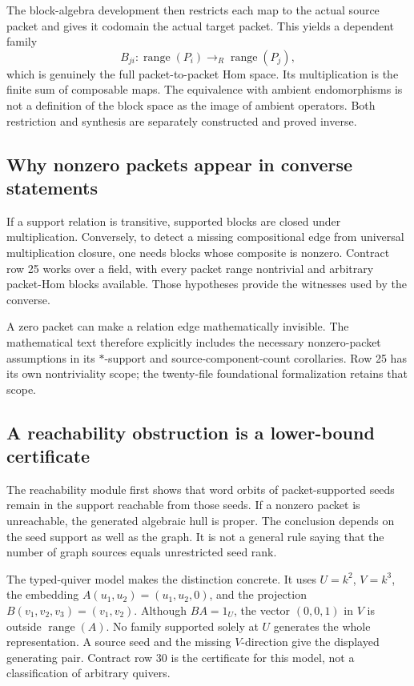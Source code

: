 \documentclass[11pt,a4paper]{article}
\begin{document}
The block-algebra development then restricts each map to the actual source packet and gives it codomain the actual target packet. This yields a dependent family
\[
B_{ji}:\operatorname{range}(P_i)\longrightarrow_R\operatorname{range}(P_j),
\]
which is genuinely the full packet-to-packet Hom space. Its multiplication is the finite sum of composable maps. The equivalence with ambient endomorphisms is not a definition of the block space as the image of ambient operators. Both restriction and synthesis are separately constructed and proved inverse.

\subsection{Why nonzero packets appear in converse statements}

If a support relation is transitive, supported blocks are closed under multiplication. Conversely, to detect a missing compositional edge from universal multiplication closure, one needs blocks whose composite is nonzero. Contract row 25 works over a field, with every packet range nontrivial and arbitrary packet-Hom blocks available. Those hypotheses provide the witnesses used by the converse.

A zero packet can make a relation edge mathematically invisible. The mathematical text therefore explicitly includes the necessary nonzero-packet assumptions in its $*$-support and source-component-count corollaries. Row 25 has its own nontriviality scope; the twenty-file foundational formalization retains that scope.

\subsection{A reachability obstruction is a lower-bound certificate}

The reachability module first shows that word orbits of packet-supported seeds remain in the support reachable from those seeds. If a nonzero packet is unreachable, the generated algebraic hull is proper. The conclusion depends on the seed support as well as the graph. It is not a general rule saying that the number of graph sources equals unrestricted seed rank.

The typed-quiver model makes the distinction concrete. It uses $U=k^2$, $V=k^3$, the embedding
$A(u_1,u_2)=(u_1,u_2,0)$, and the projection $B(v_1,v_2,v_3)=(v_1,v_2)$. Although $BA=1_U$, the vector $(0,0,1)$ in $V$ is outside $\operatorname{range}(A)$. No family supported solely at $U$ generates the whole representation. A source seed and the missing $V$-direction give the displayed generating pair. Contract row 30 is the certificate for this model, not a classification of arbitrary quivers.
\end{document}
